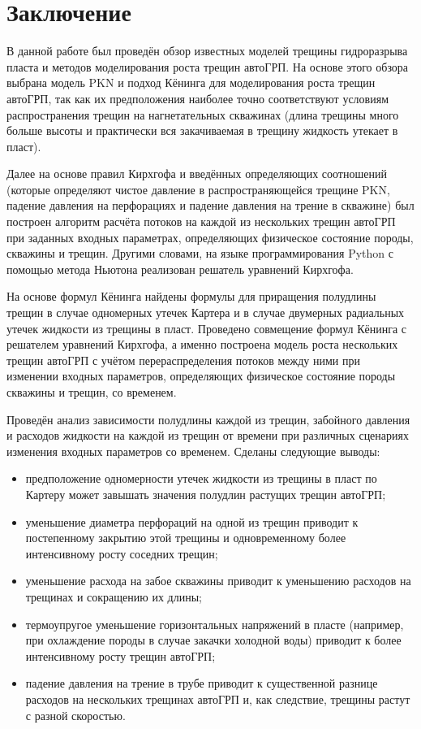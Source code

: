 \chapter*{Заключение} \label{ch-conclusion}

В данной работе был проведён обзор известных моделей трещины гидроразрыва пласта и методов моделирования роста трещин автоГРП.
На основе этого обзора выбрана модель PKN и подход Кёнинга для моделирования роста трещин автоГРП, так как их предположения наиболее точно соответствуют условиям распространения трещин на нагнетательных скважинах (длина трещины много больше высоты и практически вся закачиваемая в трещину жидкость утекает в пласт). 

Далее на основе правил Кирхгофа и введённых определяющих соотношений (которые определяют чистое давление в распространяющейся трещине PKN, падение давления на перфорациях и падение давления на трение в скважине) был построен алгоритм расчёта потоков на каждой из нескольких трещин автоГРП при заданных входных параметрах, определяющих физическое состояние породы, скважины и трещин.
Другими словами, на языке программирования Python с помощью метода Ньютона реализован решатель уравнений Кирхгофа.

На основе формул Кёнинга найдены формулы для приращения полудлины трещин в случае одномерных утечек Картера и в случае двумерных радиальных утечек жидкости из трещины в пласт.
Проведено совмещение формул Кёнинга с решателем уравнений Кирхгофа, а именно построена модель роста нескольких трещин автоГРП с учётом перераспределения потоков между ними при изменении входных параметров, определяющих физическое состояние породы скважины и трещин, со временем.

Проведён анализ зависимости полудлины каждой из трещин, забойного давления и расходов жидкости на каждой из трещин от времени при различных сценариях изменения входных параметров со временем. Сделаны следующие выводы:
\begin{itemize}
	\item предположение одномерности утечек жидкости из трещины в пласт по Картеру может завышать значения полудлин растущих трещин автоГРП;
	\item уменьшение диаметра перфораций на одной из трещин приводит к постепенному закрытию этой трещины и одновременному более интенсивному росту соседних трещин;
	\item уменьшение расхода на забое скважины приводит к уменьшению расходов на трещинах и сокращению их длины;
	\item термоупругое уменьшение горизонтальных напряжений в пласте (например, при охлаждение породы в случае закачки холодной воды) приводит к более интенсивному росту трещин автоГРП;
	\item падение давления на трение в трубе приводит к существенной разнице расходов на нескольких трещинах автоГРП и, как следствие, трещины растут с разной скоростью.
\end{itemize}

